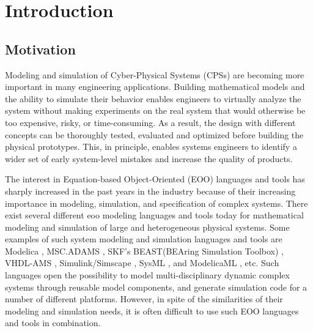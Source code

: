 

\chapter{Introduction}
\label{cha:introduction}


\section{Motivation}
\label{sec:motivation}

Modeling and simulation of Cyber-Physical Systems (CPSs) are becoming more important in many engineering applications. Building mathematical models and the ability to simulate their behavior enables engineers to virtually analyze the system without making experiments on the real system that would otherwise be too expensive, risky, or time-consuming. As a result, the design with different concepts can be thoroughly tested, evaluated and optimized before building the physical prototypes. This, in principle, enables systems engineers to identify a wider set of early system-level mistakes and increase the quality of products.

The interest in Equation-based Object-Oriented (EOO) languages and tools has sharply increased in the past years in the industry because of their increasing importance in modeling, simulation, and specification of complex systems. There exist several different \acrshort{eoo} modeling languages and tools today for mathematical modeling and simulation of large and heterogeneous physical systems. Some examples of such system modeling and simulation languages and tools are Modelica \cite{modelica}, MSC.ADAMS \cite{adams}, SKF’s BEAST(BEAring Simulation Toolbox) \cite{beast}, VHDL-AMS \cite{vhdlamsernst, vhdlamsieee}, Simulink/Simscape \cite{simulink}, SysML \cite{sysml,sysmlmorgan}, and ModelicaML \cite{modelicamlreport, modelicaml}, etc. Such languages open the possibility to model multi-disciplinary dynamic complex systems through reusable model components, and generate simulation code  for a number of different platforms. However, in spite of the similarities of their modeling and simulation needs, it is often difficult to use such EOO languages and tools in combination.


